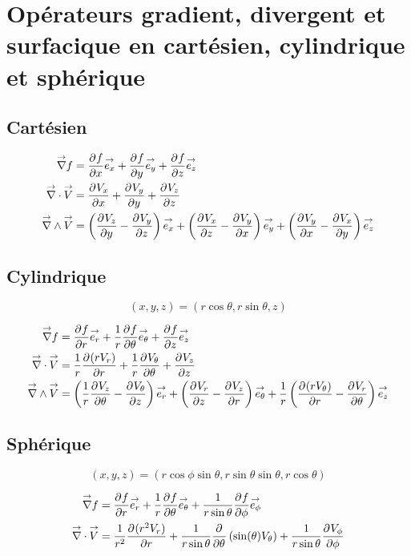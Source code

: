 \section{Opérateurs gradient, divergent et surfacique en cartésien, cylindrique et sphérique}

\subsection{Cartésien}

    \begin{align}
        \vgrad f &= \ddr{x}{f}\vect{e_x} + \ddr{y}{f}\vect{e_y}  + \ddr{z}{f}\vect{e_z} \\
        \vdiv \vect{V} &= \ddr{x}{V_x} + \ddr{y}{V_y} + \ddr{z}{V_z} \\
        \vrot\vect{V} &= \left(\ddr{y}{V_z}-\ddr{z}{V_y}\right)\vect{e_x} + \left(\ddr{z}{V_x}-\ddr{x}{V_y}\right)\vect{e_y} + \left(\ddr{x}{V_y}-\ddr{y}{V_x}\right)\vect{e_z}
    \end{align}

\subsection{Cylindrique}

    \[
        (x,y,z) = (r\cos\theta,r\sin\theta,z)
    \]

    \begin{align}
        \vgrad f &= \ddr{r}{f}\vect{e_r}
        +\frac{1}{r}\ddr{\theta}{f}\vect{e_\theta} + \ddr{z}{f}\vect{e_z}
        \\
        \vdiv \vect{V} &= \frac{1}{r}\ddr{r}{(rV_r)}+\frac{1}{r}\ddr{\theta}{V_\theta}+\ddr{z}{V_z}
        \\
        \vrot \vect{V} &= \left(\frac{1}{r}\ddr{\theta}{V_z} - \ddr{z}{V_\theta}\right)\vect{e_r} +
        \left(\ddr{z}{V_r} - \ddr{r}{V_z}\right)\vect{e_\theta} +
        \frac{1}{r}\left(\ddr{r}{(rV_\theta)}-\ddr{\theta}{V_r}\right)\vect{e_z}
    \end{align}

\subsection{Sphérique}

    \[
        (x,y,z) = (r\cos\phi\sin\theta,r\sin\theta\sin\theta,r\cos\theta)
    \]

    \begin{align}
        \vgrad f &= \ddr{r}{f}\vect{e_r}
        +\frac{1}{r}\ddr{\theta}{f}\vect{e_\theta} + \frac{1}{r\sin\theta}\ddr{\phi}{f}\vect{e_\phi}
        \\
        \vdiv \vect{V} &= \frac{1}{r^2}\ddr{r}{(r^2V_r)}
        + \frac{1}{r\sin\theta}\ddr{\theta}{}\left(\sin(\theta)V_\theta\right) + \frac{1}{r\sin\theta}\ddr{\phi}{V_\phi}
    \end{align}

